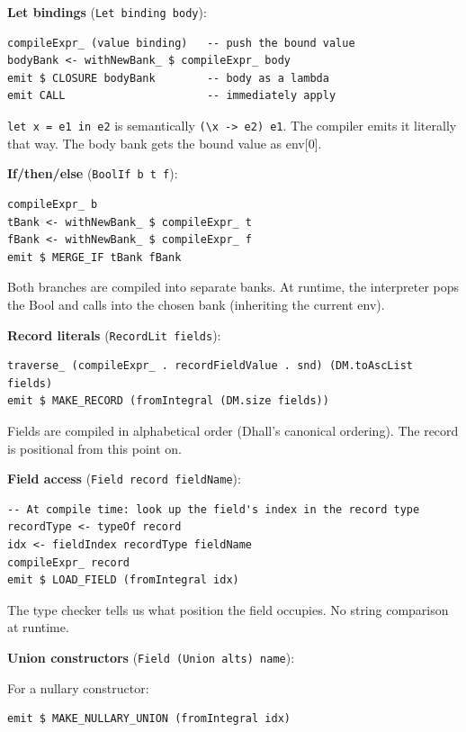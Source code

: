 \documentclass[]{article}
\begin{document}
\textbf{Let bindings} (\texttt{Let\ binding\ body}):

\begin{verbatim}
compileExpr_ (value binding)   -- push the bound value
bodyBank <- withNewBank_ $ compileExpr_ body
emit $ CLOSURE bodyBank        -- body as a lambda
emit CALL                      -- immediately apply
\end{verbatim}

\texttt{let\ x\ =\ e1\ in\ e2} is semantically
\texttt{(\textbackslash{}x\ -\textgreater{}\ e2)\ e1}. The compiler emits it
literally that way. The body bank gets the bound value as env{[}0{]}.

\textbf{If/then/else} (\texttt{BoolIf\ b\ t\ f}):

\begin{verbatim}
compileExpr_ b
tBank <- withNewBank_ $ compileExpr_ t
fBank <- withNewBank_ $ compileExpr_ f
emit $ MERGE_IF tBank fBank
\end{verbatim}

Both branches are compiled into separate banks. At runtime, the interpreter pops
the Bool and calls into the chosen bank (inheriting the current env).

\textbf{Record literals} (\texttt{RecordLit\ fields}):

\begin{verbatim}
traverse_ (compileExpr_ . recordFieldValue . snd) (DM.toAscList fields)
emit $ MAKE_RECORD (fromIntegral (DM.size fields))
\end{verbatim}

Fields are compiled in alphabetical order (Dhall's canonical ordering). The
record is positional from this point on.

\textbf{Field access} (\texttt{Field\ record\ fieldName}):

\begin{verbatim}
-- At compile time: look up the field's index in the record type
recordType <- typeOf record
idx <- fieldIndex recordType fieldName
compileExpr_ record
emit $ LOAD_FIELD (fromIntegral idx)
\end{verbatim}

The type checker tells us what position the field occupies. No string comparison
at runtime.

\textbf{Union constructors} (\texttt{Field\ (Union\ alts)\ name}):

For a nullary constructor:

\begin{verbatim}
emit $ MAKE_NULLARY_UNION (fromIntegral idx)
\end{verbatim}
\end{document}
